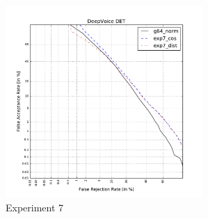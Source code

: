 \documentclass[conference]{IEEEtran}
\begin{document}
\begin{figure}[!h]
    \centering
    \includegraphics[width=7.5cm]{../scores/det7.pdf}
    \captionsetup{labelformat=empty}
    \caption{Experiment 7}
\end{figure}
\end{document}
